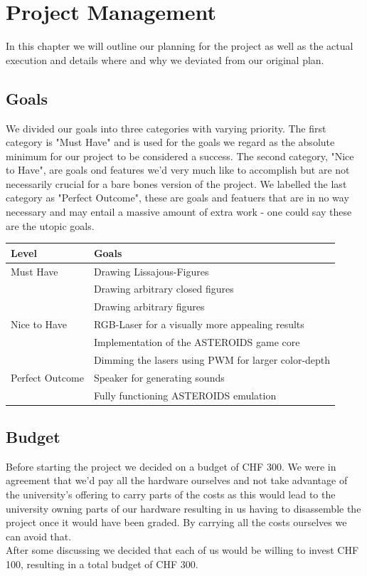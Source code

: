 \documentclass{report}
\begin{document}
\chapter{Project Management}
In this chapter we will outline our planning for the project as well as the actual execution and details where and why we deviated from our original plan.
\section{Goals}
We divided our goals into three categories with varying priority. The first category is "Must Have" and is used for the goals we regard as the absolute minimum for our project to be considered a success. The second category, "Nice to Have", are goals ond features we'd very much like to accomplish but are not necessarily crucial for a bare bones version of the project. We labelled the last category as "Perfect Outcome", these are goals and featuers that are in no way necessary and may entail a massive amount of extra work - one could say these are the utopic goals.

\begin{center}
	\begin{longtable}{l l}
		Level & Goals \\
		\hline
		Must Have & Drawing Lissajous-Figures \\
		& Drawing arbitrary closed figures \\
		& Drawing arbitrary figures \\
		\hline
		Nice to Have & RGB-Laser for a visually more appealing results \\
		& Implementation of the ASTEROIDS game core \\
		& Dimming the lasers using PWM for larger color-depth \\
		\hline
		Perfect Outcome & Speaker for generating sounds \\
		& Fully functioning ASTEROIDS emulation \\
	\end{longtable}
\end{center}

\section{Budget}
Before starting the project we decided on a budget of CHF 300. We were in agreement that we'd pay all the hardware ourselves and not take advantage of the university's offering to carry parts of the costs as this would lead to the university owning parts of our hardware resulting in us having to disassemble the project once it would have been graded. By carrying all the costs ourselves we can avoid that. \\
After some discussing we decided that each of us would be willing to invest CHF 100, resulting in a total budget of CHF 300.
\end{document}

